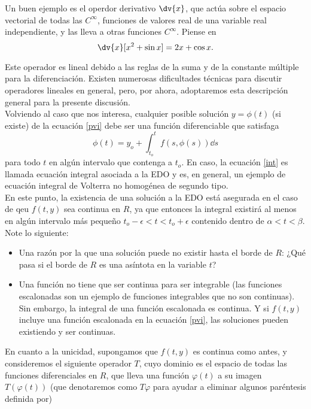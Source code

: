 Un buen ejemplo es el operdor derivativo $\dv{x}$, que actúa sobre el espacio vectorial de todas las $C^\infty$, funciones de valores real de una variable real independiente, y las lleva a otras funciones $C^\infty$. Piense en 
	$$ \dv{x} [x^2 + \sin{x}] = 2x+\cos{x}. $$
	
Este operador es lineal debido a las reglas de la suma y de la constante múltiple para la diferenciación. Existen numerosas dificultades técnicas	para discutir operadores lineales en general, pero, por ahora, adoptaremos	esta descripción general para la presente discusión. \\

Volviendo al caso que nos interesa, cualquier posible solución $y = \phi (t)$ (si existe) de la ecuación \eqref{pvi} debe ser una función diferenciable que satisfaga
	\begin{equation}
		\phi (t) = y_o + \int _{t_o} ^t f(s,\phi (s)) \dd{s} \label{int}
	\end{equation}
para todo $t$ en algún intervalo que contenga a $t_o$. En caso, la ecuación \eqref{int} es llamada ecuación integral asociada a la EDO y es, en general, un ejemplo de ecuación integral de Volterra no homogénea de segundo tipo. \\

En este punto, la existencia de una solución a la EDO está asegurada en el caso de qeu $f(t,y)$ sea continua en $R$, ya que entonces la integral existirá al menos en algún intervalo más pequeño $t_o - \epsilon < t < t_o + \epsilon$ contenido dentro de $\alpha < t < \beta$. Note lo siguiente: 

\begin{itemize}
	\item Una razón por la que una solución puede no existir hasta el borde de $R$: ¿Qué pasa si el borde de $R$ es una asíntota en la variable $t$?
	\item Una función no tiene que ser continua para ser integrable (las funciones escalonadas son un ejemplo de funciones integrables que no son continuas). Sin embargo, la integral de una función escalonada es continua. Y si $f(t,y)$ incluye una función escalonada en la ecuación \eqref{pvi}, las soluciones pueden existiendo y ser continuas.
\end{itemize}


En cuanto a la unicidad, supongamos que $f(t,y)$ es continua como antes, y consideremos el siguiente operador $T$, cuyo dominio es el espacio de todas las funciones diferenciales en $R$, que lleva una función $\varphi (t)$ a su imagen $T(\varphi (t))$ (que denotaremos como $T\varphi$ para ayudar a eliminar algunos paréntesis definida por)

